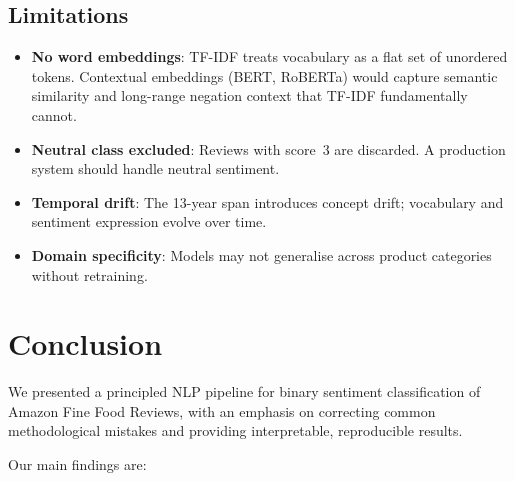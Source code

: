 \documentclass[11pt,a4paper]{article}
\begin{document}
\subsection{Limitations}

\begin{itemize}[leftmargin=2em]
  \item \textbf{No word embeddings}: TF-IDF treats vocabulary as a flat
        set of unordered tokens. Contextual embeddings (BERT, RoBERTa)
        would capture semantic similarity and long-range negation context
        that TF-IDF fundamentally cannot.
  \item \textbf{Neutral class excluded}: Reviews with score~3 are discarded.
        A production system should handle neutral sentiment.
  \item \textbf{Temporal drift}: The 13-year span introduces concept drift;
        vocabulary and sentiment expression evolve over time.
  \item \textbf{Domain specificity}: Models may not generalise across
        product categories without retraining.
\end{itemize}

\section{Conclusion}
\label{sec:conclusion}

We presented a principled NLP pipeline for binary sentiment classification
of Amazon Fine Food Reviews, with an emphasis on correcting common
methodological mistakes and providing interpretable, reproducible results.

Our main findings are:
\end{document}
